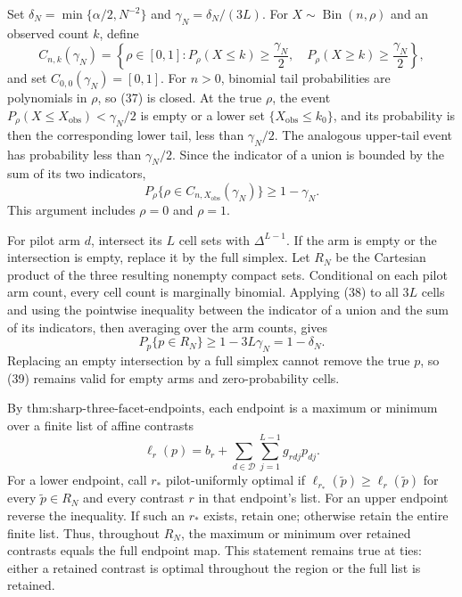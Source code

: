 Set \(\delta_N=\min\{\alpha/2,N^{-2}\}\) and \(\gamma_N=\delta_N/(3L)\).  For \(X\sim\operatorname{Bin}(n,\rho)\) and an observed count \(k\), define
\[
 C_{n,k}(\gamma_N)=\left\{\rho\in[0,1]:
 P_\rho(X\leq k)\geq\frac{\gamma_N}{2},\quad
 P_\rho(X\geq k)\geq\frac{\gamma_N}{2}\right\},                         \tag{37}
\]
and set \(C_{0,0}(\gamma_N)=[0,1]\).  For \(n>0\), binomial tail probabilities are polynomials in \(\rho\), so (37) is closed.  At the true \(\rho\), the event \(P_\rho(X\leq X_{\mathrm{obs}})<\gamma_N/2\) is empty or a lower set \(\{X_{\mathrm{obs}}\leq k_0\}\), and its probability is then the corresponding lower tail, less than \(\gamma_N/2\).  The analogous upper-tail event has probability less than \(\gamma_N/2\).  Since the indicator of a union is bounded by the sum of its two indicators,
\[
 P_\rho\{\rho\in C_{n,X_{\mathrm{obs}}}(\gamma_N)\}\geq1-\gamma_N.        \tag{38}
\]
This argument includes \(\rho=0\) and \(\rho=1\).

For pilot arm \(d\), intersect its \(L\) cell sets with \(\Delta^{L-1}\).  If the arm is empty or the intersection is empty, replace it by the full simplex.  Let \(R_N\) be the Cartesian product of the three resulting nonempty compact sets.  Conditional on each pilot arm count, every cell count is marginally binomial.  Applying (38) to all \(3L\) cells and using the pointwise inequality between the indicator of a union and the sum of its indicators, then averaging over the arm counts, gives
\[
 P_p\{p\in R_N\}\geq1-3L\gamma_N=1-\delta_N.                              \tag{39}
\]
Replacing an empty intersection by a full simplex cannot remove the true \(p\), so (39) remains valid for empty arms and zero-probability cells.

By \(\text{thm:sharp-three-facet-endpoints}\), each endpoint is a maximum or minimum over a finite list of affine contrasts
\[
 \ell_r(p)=b_r+\sum_{d\in\mathcal D}\sum_{j=1}^{L-1}g_{rdj}p_{dj}.          \tag{40}
\]
For a lower endpoint, call \(r_*\) pilot-uniformly optimal if \(\ell_{r_*}(\widetilde p)\geq\ell_r(\widetilde p)\) for every \(\widetilde p\in R_N\) and every contrast \(r\) in that endpoint's list.  For an upper endpoint reverse the inequality.  If such an \(r_*\) exists, retain one; otherwise retain the entire finite list.  Thus, throughout \(R_N\), the maximum or minimum over retained contrasts equals the full endpoint map.  This statement remains true at ties: either a retained contrast is optimal throughout the region or the full list is retained.

